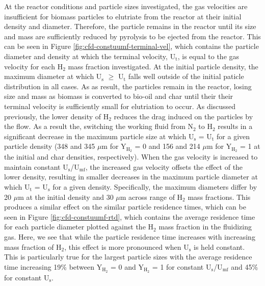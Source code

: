 \documentclass{article}
\begin{document}
At the reactor conditions and particle sizes investigated, the gas velocities are insufficient for biomass particles to elutriate from the reactor at their initial density and diameter. Therefore, the particle remains in the reactor until its size and mass are sufficiently reduced by pyrolysis to be ejected from the reactor. This can be seen in Figure \ref{fig:cfd-constuumf-terminal-vel}, which contains the particle diameter and density at which the terminal velocity, U$_\text{t}$, is equal to the gas velocity for each H$_2$ mass fraction investigated. At the initial particle density, the maximum diameter at which U$_\text{s}$ $\ge$ U$_\text{t}$ falls well outside of the initial paticle distribution in all cases. As as result, the particles remain in the reactor, losing size and mass as biomass is converted to bio-oil and char until their their terminal velocity is sufficiently small for elutriation to occur. As discussed previously, the lower density of H$_2$ reduces the drag induced on the particles by the flow. As a result the, switching the working fluid from N$_2$ to H$_2$ results in a significant decrease in the maximum particle size at which U$_\text{s}$ = U$_\text{t}$ for a given particle density (348 and 345 $\mu$m for Y$_{\text{H}_2}$ = 0 and 156 and 214 $\mu$m for Y$_{\text{H}_2}$ = 1 at the initial and char densities, respectively). When the gas velocity is increased to maintain constant U$_\text{s}$/U$_\text{mf}$, the increased gas velocity offsets the effect of the lower density, resulting in smaller decreases in the maximum particle diameter at which U$_\text{t}$ = U$_\text{s}$ for a given density. Specifically, the maximum diameters differ by 20 $\mu$m at the initial density and 30 $\mu$m across range of H$_2$ mass fractions. This produces a similar effect on the similar particle residence times, which can be seen in Figure \ref{fig:cfd-constuumf-rtd}, which contains the average residence time for each particle diameter plotted against the H$_2$ mass fraction in the fluidizing gas. Here, we see that while the particle residence time increases with increasing mass fraction of H$_2$, this effect is more pronounced when U$_\text{s}$ is held constant. This is particularly true for the largest particle sizes with the average residence time increasing 19\% between Y$_{\text{H}_2}$ = 0 and Y$_{\text{H}_2}$ = 1 for constant U$_\text{s}$/U$_\text{mf}$ and 45\% for constant U$_\text{s}$.
\end{document}
